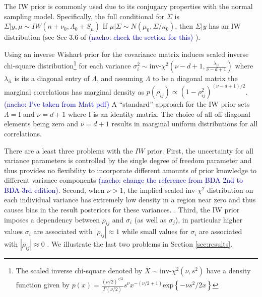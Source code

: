 \documentclass[a4paper]{article}
\newcommand{\nacho}[1]{\textcolor{blue}{(nacho: #1)}}
\newcommand{\I}{\mathrm{I}}
\begin{document}
The IW prior is commonly used due to its conjugacy properties with the normal sampling model. Specifically, the full conditional for $\Sigma$ is $\Sigma \vert y,\mu \sim IW(n+\nu_0, \Lambda_0+S_\mu)$ If $\mu|\Sigma \sim N(\mu_0,\Sigma/\kappa_0)$, then $\Sigma|y$ has an IW distribution (see Sec 3.6 of \cite{bda2013} \nacho{check the section for this} ). 

Using an inverse Wishart prior for the covariance matrix induces scaled inverse chi-square distribution\footnote{The scaled inverse chi-square denoted by $X \sim \mbox{inv-}\chi^2(\nu, s^2)$ have a density function given by $p(x) =  \frac{(\nu/2)^{\nu/2}} {\Gamma(\nu/2)} s^{\nu}x^{-(\nu/2 + 1)} \mbox{exp}\left\{-\nu s^2 / 2x\right\} $}  for each variance $\sigma_i^2\sim \mbox{inv-}\chi^2(\nu - d + 1, \frac{\lambda_{ii}}{\nu-d+1} )$ where $\lambda_{ii}$ is its a diagonal entry of $\Lambda$, and assuming $\Lambda$ to be a diagonal matrix the marginal correlations has marginal density as $p(\rho_{ij}) \propto (1 - \rho_{ij}^2)^{(\nu - d + 1)/2}$. \nacho{I've taken from Matt pdf} A ``standard'' approach for the IW prior sets $\Lambda=\I$ and $\nu=d+1$ where $\I$ is an identity matrix. The choice of all off diagonal elements being zero and $\nu=d+1$ results in marginal uniform distributions for all correlations. 

There are a least three problems with the $IW$ prior. First, the uncertainty for all variance parameters is controlled by the single degree of freedom parameter and thus provides no flexibility to incorporate different amounts of prior knowledge to different variance components \citep{bda2013} \nacho{change the reference from BDA 2nd to BDA 3rd edition}. Second, when $\nu>1$, the implied scaled inv-$\chi^2$ distribution on each individual variance has extremely low density in a region near zero and thus causes bias in the result posteriors for these variances. \citep{gelman2006prior}. Third, the IW prior imposes a dependency between $\rho_{ij}$ and $\sigma_i$ (as well as $\sigma_j$), in particular higher values $\sigma_i$ are associated with $|\rho_{ij}|\approx 1$ while small values for $\sigma_i$ are associated with $|\rho_{ij}|\approx 0$ \citep{visualize}.  We illustrate the last two problems in Section \ref{sec:results}.

\end{document}
